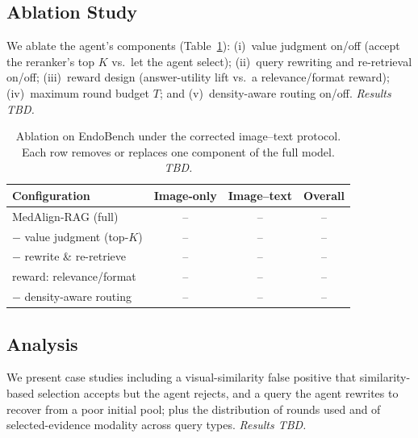 \subsection{Ablation Study}
\label{sec:ablation}
We ablate the agent's components (Table~\ref{tab:ablation}): (i)~value judgment
on/off (accept the reranker's top $K$ vs.\ let the agent select); (ii)~query
rewriting and re-retrieval on/off; (iii)~reward design (answer-utility lift vs.\ a
relevance/format reward); (iv)~maximum round budget $T$; and (v)~density-aware
routing on/off. \emph{Results TBD.}

\begin{table}[t]
  \centering
  \begin{tabular}{lccc}
    \toprule
    Configuration & Image-only & Image--text & Overall \\
    \midrule
    MedAlign-RAG (full)              & -- & -- & -- \\
    \midrule
    $-$ value judgment (top-$K$)     & -- & -- & -- \\
    $-$ rewrite \& re-retrieve       & -- & -- & -- \\
    \; reward: relevance/format      & -- & -- & -- \\
    $-$ density-aware routing        & -- & -- & -- \\
    \bottomrule
  \end{tabular}
  \caption{Ablation on EndoBench under the corrected image--text protocol.
  Each row removes or replaces one component of the full model. \emph{TBD.}}
  \label{tab:ablation}
\end{table}

\subsection{Analysis}
\label{sec:analysis}
We present case studies including a visual-similarity false positive that
similarity-based selection accepts but the agent rejects, and a query the agent
rewrites to recover from a poor initial pool; plus the distribution of rounds
used and of selected-evidence modality across query types. \emph{Results TBD.}

